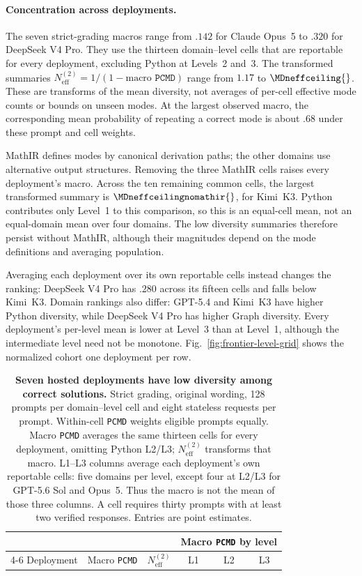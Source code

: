 \documentclass{article}
\newcommand{\1}{\mathbf 1}
\newcommand{\pmd}{\texttt{PCMD}}
\newcommand{\neff}{\ensuremath{N^{(2)}_{\mathrm{eff}}}}
\theoremstyle{remark}
\theoremstyle{definition}
\theoremstyle{plain}
\begin{document}
\paragraph{Concentration across deployments.}
The seven strict-grading macros range from $.142$ for Claude Opus~5 to
$.320$ for DeepSeek V4 Pro. They use the thirteen domain--level cells that
are reportable for every deployment, excluding Python at Levels~2 and~3.
The transformed summaries $\neff=1/(1-\text{macro }\pmd)$ range from
$1.17$ to $\MDneffceiling{}$. These are transforms of the mean diversity,
not averages of per-cell effective mode counts or bounds on unseen modes.
At the largest observed macro, the corresponding mean probability of
repeating a correct mode is about $.68$ under these prompt and cell weights.

MathIR defines modes by canonical derivation paths; the other domains use
alternative output structures. Removing the three MathIR cells raises every
deployment's macro. Across the ten remaining common cells, the largest
transformed summary is $\MDneffceilingnomathir{}$, for Kimi~K3. Python
contributes only Level~1 to this comparison, so this is an equal-cell mean,
not an equal-domain mean over four domains. The low diversity summaries
therefore persist without MathIR, although their magnitudes depend on the
mode definitions and averaging population.

Averaging each deployment over its own reportable cells instead changes the
ranking: DeepSeek V4 Pro has $.280$ across its fifteen cells and falls below
Kimi~K3. Domain rankings also differ: GPT-5.4 and Kimi~K3 have higher Python
diversity, while DeepSeek V4 Pro has higher Graph diversity. Every deployment's
per-level mean is lower at Level~3 than at Level~1, although the intermediate
level need not be monotone. Fig.~\ref{fig:frontier-level-grid} shows the
normalized cohort one deployment per row.

\begin{table}[!htbp]
  \centering
  \caption{\textbf{Seven hosted deployments have low diversity among correct solutions.}
  Strict grading, original wording, 128 prompts per domain--level cell and
  eight stateless requests per prompt. Within-cell \pmd{} weights eligible
  prompts equally. Macro \pmd{} averages the same thirteen cells for every
  deployment, omitting Python L2/L3; $\neff$ transforms that macro.
  L1--L3 columns average each deployment's own reportable cells: five domains
  per level, except four at L2/L3 for GPT-5.6 Sol and Opus~5. Thus the macro
  is not the mean of those three columns. A cell requires thirty prompts
  with at least two verified responses. Entries are point estimates.}
  \label{tab:hosted-cohort-mode-diversity}
  \small
  \begin{tabular}{lccccc}
    \toprule
    & & & \multicolumn{3}{c}{Macro \pmd{} by level} \\
    \cmidrule(lr){4-6}
    Deployment & Macro \pmd{} & $\neff$ & L1 & L2 & L3 \\
    \midrule
    
  \end{tabular}
\end{table}
\end{document}
